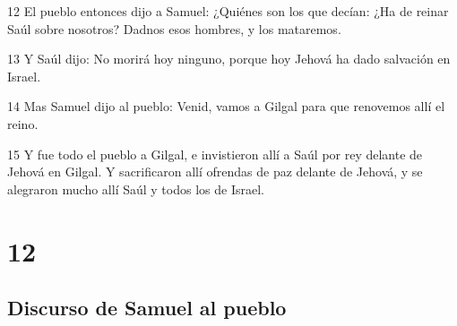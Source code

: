 \par 12 El pueblo entonces dijo a Samuel: ¿Quiénes son los que decían: ¿Ha de reinar Saúl sobre nosotros? Dadnos esos hombres, y los mataremos.
\par 13 Y Saúl dijo: No morirá hoy ninguno, porque hoy Jehová ha dado salvación en Israel.
\par 14 Mas Samuel dijo al pueblo: Venid, vamos a Gilgal para que renovemos allí el reino.
\par 15 Y fue todo el pueblo a Gilgal, e invistieron allí a Saúl por rey delante de Jehová en Gilgal. Y sacrificaron allí ofrendas de paz delante de Jehová, y se alegraron mucho allí Saúl y todos los de Israel.

\chapter{12}

\section*{Discurso de Samuel al pueblo}

